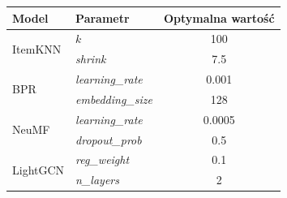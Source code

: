 \begin{tabular}{|l|l|c|}
    \hline
    \textbf{Model} & \textbf{Parametr} & \textbf{Optymalna wartość} \\ \hline
    \multirow{2}{*}{ItemKNN}  & $k$ & 100 \\ \cline{2-3}
                              & \textit{shrink} & 7.5 \\ \hline
    \multirow{2}{*}{BPR}      & \textit{learning\_rate} & 0.001 \\ \cline{2-3}
                              & \textit{embedding\_size} & 128 \\ \hline
    \multirow{2}{*}{NeuMF}    & \textit{learning\_rate} & 0.0005 \\ \cline{2-3}
                              & \textit{dropout\_prob} & 0.5 \\ \hline
    \multirow{2}{*}{LightGCN} & \textit{reg\_weight} & 0.1 \\ \cline{2-3}
                              & \textit{n\_layers} & 2 \\ \hline
\end{tabular}
